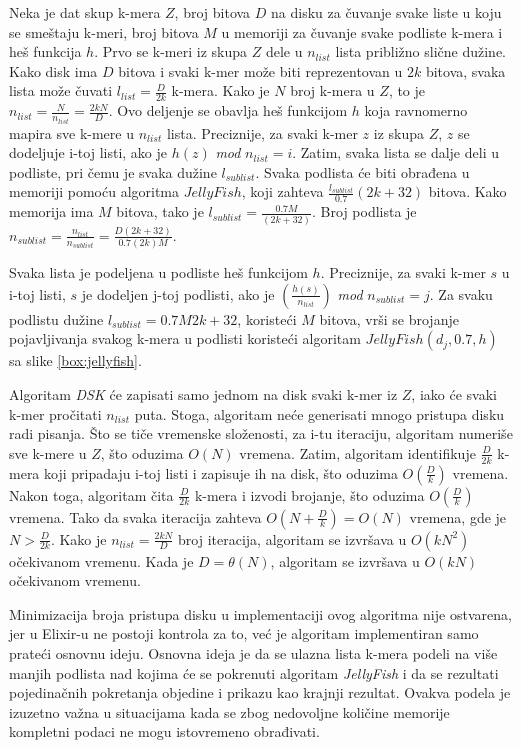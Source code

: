 \documentclass[12pt,oneside]{memoir}
\begin{document}
Neka je dat skup k-mera $Z$, broj bitova $D$ na disku za čuvanje svake liste u koju se smeštaju k-meri, broj bitova $M$ u memoriji za čuvanje svake podliste k-mera i heš funkcija $h$. Prvo se k-meri iz skupa $Z$ dele u $n_{list}$ lista približno slične dužine. Kako disk ima $D$ bitova i svaki k-mer može biti reprezentovan u $2k$ bitova, svaka lista može čuvati $l_{list} =  \frac{D}{2k}$ k-mera. Kako je $N$ broj k-mera u $Z$, to je $n_{list} = \frac{N}{n_{list}} = \frac{2kN}{D}$. Ovo deljenje se obavlja heš funkcijom $h$ koja ravnomerno mapira sve k-mere u $n_{list}$ lista. Preciznije, za svaki k-mer $z$ iz skupa $Z$, $z$ se dodeljuje i-toj listi, ako je $h(z)$ \textit{mod} $n_{list} = i$. Zatim, svaka lista se dalje deli u podliste, pri čemu je svaka dužine $l_{sublist}$. Svaka podlista će biti obrađena u memoriji pomoću algoritma $JellyFish$, koji zahteva $\frac{l_{sublist}}{0.7}(2k +32)$ bitova. Kako memorija ima $M$ bitova, tako je $l_{sublist} = \frac{0.7M}{(2k + 32)}$. Broj podlista je  $n_{sublist} = \frac{n_{list}}{n_{sublist}} = \frac{D(2k + 32)}{0.7(2k)M}$. 

Svaka lista je podeljena u podliste heš funkcijom $h$. Preciznije, za svaki k-mer $s$ u i-toj listi, $s$ je dodeljen j-toj podlisti, ako je $(\frac{h(s)}{n_{list}})$ \textit{mod} $n_{sublist} = j$. Za svaku podlistu dužine $l_{sublist} = {0.7M}{2k + 32}$, koristeći $M$ bitova,  vrši se brojanje pojavljivanja svakog k-mera u podlisti koristeći algoritam $JellyFish(d_j, 0.7, h)$ sa slike \ref{box:jellyfish}.

Algoritam \textit{DSK} će zapisati samo jednom na disk svaki k-mer iz $Z$, iako će svaki k-mer pročitati $n_{list}$ puta. Stoga, algoritam neće generisati mnogo pristupa disku radi pisanja. Što se tiče vremenske složenosti, za i-tu iteraciju, algoritam numeriše sve k-mere u $Z$, što oduzima $O(N)$ vremena. Zatim, algoritam identifikuje $\frac{D}{2k}$ k-mera koji pripadaju i-toj listi i zapisuje ih na disk, što oduzima $O(\frac{D}{k})$ vremena. Nakon toga, algoritam  čita $\frac{D}{2k}$ k-mera i izvodi brojanje, što oduzima $O(\frac{D}{k})$ vremena. Tako da svaka iteracija zahteva $O(N + \frac{D}{k}) = O(N)$ vremena, gde je $N > \frac{D}{2k}$. Kako je $n_{list} = \frac{2kN}{D}$ broj iteracija, algoritam se izvršava u $O(kN^2)$ očekivanom vremenu. Kada je $D = \theta(N)$, algoritam se izvršava u $O(kN)$ očekivanom vremenu.

Minimizacija broja pristupa disku u implementaciji ovog algoritma nije ostvarena, jer u Elixir-u ne postoji kontrola za to, već je algoritam implementiran samo prateći osnovnu ideju. Osnovna ideja je da se ulazna lista k-mera podeli na više manjih podlista nad kojima će se pokrenuti algoritam \textit{JellyFish} i da se rezultati pojedinačnih pokretanja objedine i prikazu kao krajnji rezultat. Ovakva podela je izuzetno važna u situacijama kada se zbog nedovoljne količine memorije kompletni podaci ne mogu istovremeno obrađivati.
\end{document}
